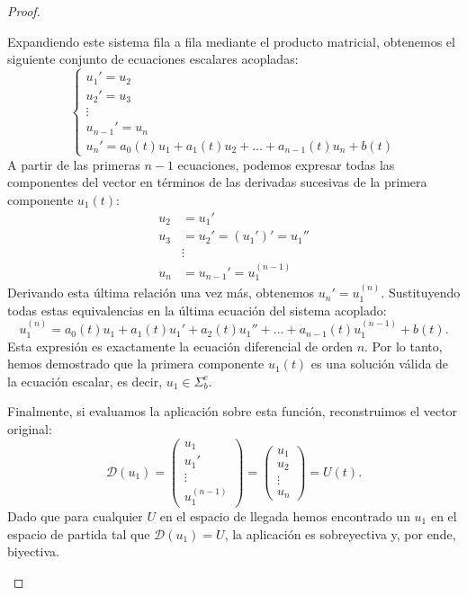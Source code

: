 \begin{proof}
\begin{itemize}
        Expandiendo este sistema fila a fila mediante el producto matricial, obtenemos el siguiente conjunto de ecuaciones escalares acopladas:
        \[
            \begin{cases}
                u_1' = u_2 \\
                u_2' = u_3 \\
                \vdots \\
                u_{n-1}' = u_n \\
                u_n' = a_0(t) u_1 + a_1(t) u_2 + \dots + a_{n-1}(t) u_n + b(t)
            \end{cases}
        \]
        A partir de las primeras $n-1$ ecuaciones, podemos expresar todas las componentes del vector en términos de las derivadas sucesivas de la primera componente $u_1(t)$:
        \begin{align*}
            u_2 &= u_1' \\
            u_3 &= u_2' = (u_1')' = u_1'' \\
            &\vdots \\
            u_n &= u_{n-1}' = u_1^{(n-1)}
        \end{align*}
        Derivando esta última relación una vez más, obtenemos $u_n' = u_1^{(n)}$. Sustituyendo todas estas equivalencias en la última ecuación del sistema acoplado:
        \[
            u_1^{(n)} = a_0(t) u_1 + a_1(t) u_1' + a_2(t) u_1'' + \dots + a_{n-1}(t) u_1^{(n-1)} + b(t).
        \]
        Esta expresión es exactamente la ecuación diferencial de orden $n$. Por lo tanto, hemos demostrado que la primera componente $u_1(t)$ es una solución válida de la ecuación escalar, es decir, $u_1 \in \Sigma_b^e$. 
        
        Finalmente, si evaluamos la aplicación sobre esta función, reconstruimos el vector original:
        \[
            \mathcal{D}(u_1) = \begin{pmatrix} u_1 \\ u_1' \\ \vdots \\ u_1^{(n-1)} \end{pmatrix} = \begin{pmatrix} u_1 \\ u_2 \\ \vdots \\ u_n \end{pmatrix} = U(t).
        \]
        Dado que para cualquier $U$ en el espacio de llegada hemos encontrado un $u_1$ en el espacio de partida tal que $\mathcal{D}(u_1) = U$, la aplicación es sobreyectiva y, por ende, biyectiva. 
    \end{itemize}
\end{proof}

